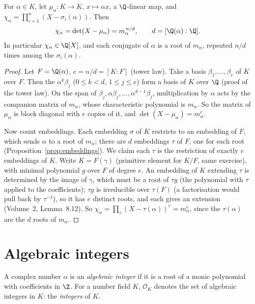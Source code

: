 \begin{proposition}\label{prop:charpoly}
For $\alpha\in K$, let $\mu_\alpha:K\to K$, $x\mapsto\alpha x$, a $\Q$-linear map, and
$\chi_\alpha=\prod_{i=1}^n(X-\sigma_i(\alpha))$. Then
\[
\chi_\alpha=\det(X-\mu_\alpha)=m_\alpha^{\,n/d},\qquad d=[\Q(\alpha):\Q].
\]
In particular $\chi_\alpha\in\Q[X]$, and each conjugate of $\alpha$ is a root of $m_\alpha$, repeated $n/d$ times
among the $\sigma_i(\alpha)$.
\end{proposition}
\begin{proof}
Let $F=\Q(\alpha)$, $e=n/d=[K:F]$ (tower law). Take a basis $\beta_1,\dots,\beta_e$ of $K$ over $F$. Then the
$\alpha^k\beta_j$ ($0\le k<d$, $1\le j\le e$) form a basis of $K$ over $\Q$ (proof of the tower law). On the span of
$\beta_j,\alpha\beta_j,\dots,\alpha^{d-1}\beta_j$, multiplication by $\alpha$ acts by the companion matrix of
$m_\alpha$, whose characteristic polynomial is $m_\alpha$. So the matrix of $\mu_\alpha$ is block diagonal with $e$
copies of it, and $\det(X-\mu_\alpha)=m_\alpha^e$.

Now count embeddings. Each embedding $\sigma$ of $K$ restricts to an embedding of $F$, which sends $\alpha$ to a root of
$m_\alpha$; there are $d$ embeddings $\tau$ of $F$, one for each root (Proposition~\ref{prop:embeddings}). We claim each
$\tau$ is the restriction of exactly $e$ embeddings of $K$. Write $K=F(\gamma)$ (primitive element for $K/F$, same
exercise), with minimal polynomial $g$ over $F$ of degree $e$. An embedding of $K$ extending $\tau$ is determined by the
image of $\gamma$, which must be a root of $\tau g$ (the polynomial with $\tau$ applied to the coefficients); $\tau g$
is irreducible over $\tau(F)$ (a factorisation would pull back by $\tau^{-1}$), so it has $e$ distinct roots, and each
gives an extension (Volume~2, Lemma~8.12). So $\chi_\alpha=\prod_\tau(X-\tau(\alpha))^e=m_\alpha^e$, since the
$\tau(\alpha)$ are the $d$ roots of $m_\alpha$.
\end{proof}

\section{Algebraic integers}

\begin{definition}
A complex number $\alpha$ is an \emph{algebraic integer} if it is a root of a monic polynomial with coefficients in $\Z$.
For a number field $K$, $\mathcal O_K$ denotes the set of algebraic integers in $K$: the \emph{integers} of $K$.
\end{definition}

